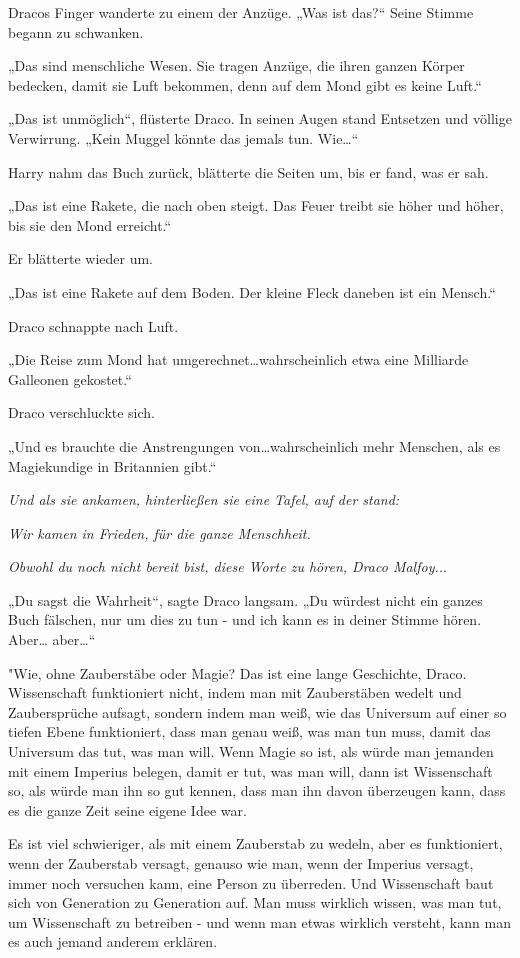 {Dracos Finger wanderte zu einem der Anzüge. „Was ist das?“ Seine Stimme begann zu schwanken.

„Das sind menschliche Wesen. Sie tragen Anzüge, die ihren ganzen Körper bedecken, damit sie Luft bekommen, denn auf dem Mond gibt es keine Luft.“

„Das ist unmöglich“, flüsterte Draco. In seinen Augen stand Entsetzen und völlige Verwirrung. „Kein Muggel könnte das jemals tun. Wie…“

Harry nahm das Buch zurück, blätterte die Seiten um, bis er fand, was er sah.

„Das ist eine Rakete, die nach oben steigt. Das Feuer treibt sie höher und höher, bis sie den Mond erreicht.“

Er blätterte wieder um.

„Das ist eine Rakete auf dem Boden. Der kleine Fleck daneben ist ein Mensch.“

Draco schnappte nach Luft.

„Die Reise zum Mond hat umgerechnet…wahrscheinlich etwa eine Milliarde Galleonen gekostet.“

Draco verschluckte sich.

„Und es brauchte die Anstrengungen von…wahrscheinlich mehr Menschen, als es Magiekundige in Britannien gibt.“

\emph{Und als sie ankamen, hinterließen sie eine Tafel, auf der stand:}

\emph{Wir kamen in Frieden, für die ganze Menschheit.}

\emph{Obwohl du noch nicht bereit bist, diese Worte zu hören, Draco Malfoy..}.

„Du sagst die Wahrheit“, sagte Draco langsam. „Du würdest nicht ein ganzes Buch fälschen, nur um dies zu tun - und ich kann es in deiner Stimme hören. Aber… aber…“

"Wie, ohne Zauberstäbe oder Magie? Das ist eine lange Geschichte, Draco. Wissenschaft funktioniert nicht, indem man mit Zauberstäben wedelt und Zaubersprüche aufsagt, sondern indem man weiß, wie das Universum auf einer so tiefen Ebene funktioniert, dass man genau weiß, was man tun muss, damit das Universum das tut, was man will. Wenn Magie so ist, als würde man jemanden mit einem Imperius belegen, damit er tut, was man will, dann ist Wissenschaft so, als würde man ihn so gut kennen, dass man ihn davon überzeugen kann, dass es die ganze Zeit seine eigene Idee war.

Es ist viel schwieriger, als mit einem Zauberstab zu wedeln, aber es funktioniert, wenn der Zauberstab versagt, genauso wie man, wenn der Imperius versagt, immer noch versuchen kann, eine Person zu überreden. Und Wissenschaft baut sich von Generation zu Generation auf. Man muss wirklich wissen, was man tut, um Wissenschaft zu betreiben - und wenn man etwas wirklich versteht, kann man es auch jemand anderem erklären.

}
